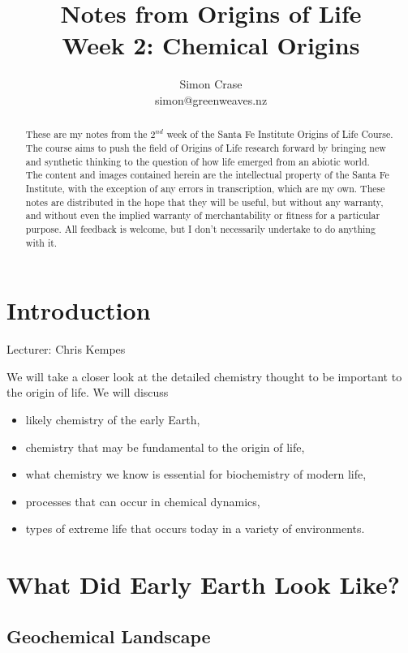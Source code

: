 \documentclass[]{article}
\title{
	Notes from Origins of Life\\
	Week 2: Chemical Origins
}
\author{Simon Crase\\simon@greenweaves.nz}
\begin{document}
\maketitle

\begin{abstract}
   These are my notes from the $2^{nd}$ week of the Santa Fe Institute Origins of Life Course\cite{sfi2020}. The course aims to push the field of Origins of Life research forward by bringing new and synthetic thinking to the question of how life emerged from an abiotic world.\\
   The content and images contained herein are the intellectual property of the Santa Fe Institute, with the exception of any errors in transcription, which are my own.
   These notes are distributed in the hope that they will be useful,
   but without any warranty, and without even the implied warranty of
   merchantability or fitness for a particular purpose. All feedback is welcome,
   but I don't necessarily undertake to do anything with it.

\end{abstract}

\setcounter{tocdepth}{2}
\tableofcontents
\listoffigures

\section{Introduction}

Lecturer: Chris Kempes

We will take a closer look at the detailed chemistry thought to be important to the origin of life. We will discuss
\begin{itemize}
	\item likely chemistry of the early Earth,
	\item chemistry that may be  fundamental to the origin of life,
	\item what chemistry we know is essential for biochemistry of modern life,
	\item processes that can occur in chemical dynamics, 
	\item types of extreme life that occurs today in a variety of environments.
\end{itemize}


\section{What Did Early Earth Look Like?}

\subsection{Geochemical Landscape}
\end{document}
